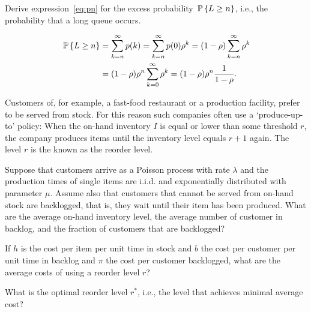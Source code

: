 \begin{question}
  Derive expression~\ref{eq:pn} for the excess probability $\P{L\geq n}$, i.e., the probability that a long queue occurs. 
  \begin{solution}
    \begin{equation*}
      \begin{split}
 \P{L\geq n} 
 &= \sum_{k=n}^\infty p(k) = \sum_{k=n}^\infty p(0)\rho^k = (1-\rho)\sum_{k=n}^\infty \rho^k \\
 &= (1-\rho)\rho^n \sum_{k=0}^\infty\rho^k = (1-\rho) \rho^n \frac1{1-\rho}.
\end{split}
\end{equation*}
\end{solution}
\end{question}


\begin{question}[use=false]
\label{q:basestock}
Customers of, for example, a fast-food restaurant or a production
facility, prefer to be served from stock. For this reason such
companies often use a `produce-up-to' policy: When the on-hand
inventory $I$ is equal or lower than some threshold $r$, the company
produces items until the inventory level equals $r+1$ again. The level
$r$ is the known as the reorder level.

Suppose that customers arrive as a Poisson process with rate $\lambda$
and the production times of single items are i.i.d. and exponentially
distributed with parameter $\mu$. Assume also that customers that
cannot be served from on-hand stock are backlogged, that is, they wait
until their item has been produced. What are the average on-hand
inventory level, the average number of customer in backlog, and the
fraction of customers that are backlogged?

If $h$ is the cost per item per unit time in stock and $b$ the cost
per customer per unit time in backlog and $\pi$ the cost per customer
backlogged, what are the average costs of using a reorder level $r$? 

What is the optimal reorder level $r^*$, i.e., the level that achieves
minimal average cost?


  \begin{solution}
\tbd
  \end{solution}
\end{question}


